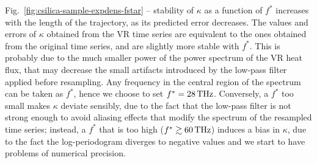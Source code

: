 Fig.~\ref{fig:csilica-sample-expdens-fstar} -- stability of $\kappa$ as a function of $f^*$ increases with the length of the trajectory, as its predicted error decreases. The values and errors of $\kappa$ obtained from the VR time series are equivalent to the ones obtained from the original time series, and are slightly more stable with $f^*$. This is probably due to the much smaller power of the power spectrum of the VR heat flux, that may decrease the small artifacts introduced by the low-pass filter applied before resampling. 
Any frequency in the central region of the spectrum can be taken as $f^*$, hence we choose to set $f^*=28\,\mathrm{THz}$. Conversely, a $f^*$ too small makes $\kappa$ deviate sensibly, due to the fact that the low-pass filter is not strong enough to avoid aliasing effects that modify the spectrum of the resampled time series; instead, a $f^*$ that is too high ($f^*\gtrsim 60\,\mathrm{THz}$) induces a bias in $\kappa$, due to the fact the log-periodogram diverges to negative values and we start to have problems of numerical precision.

